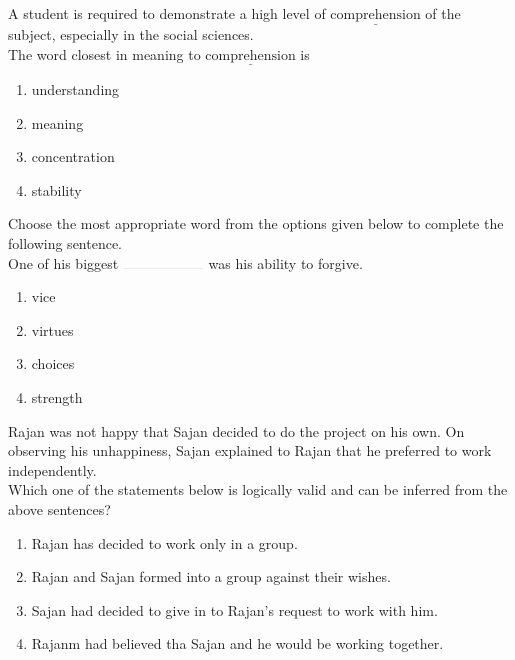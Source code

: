 \iffalse
\chapter{2013}
\author{EE24BTECH11003}
\section{ce}
\fi
\item A student is required to demonstrate a high level of $\underline{\text{comprehension}}$ of the subject, especially in the social sciences.\\
The word closest in meaning to $\underline{\text{comprehension}}$ is
\hfill{}
\begin{enumerate}
\item understanding
\item meaning
\item concentration
\item stability
\end{enumerate}

\item Choose the most appropriate word from the options given below to complete the following sentence.\\
One of his biggest $\rule{2cm}{0.1pt}$ was his ability to forgive.
\hfill{}
\begin{enumerate}
\item vice
\item virtues
\item choices
\item strength
\end{enumerate}

\item Rajan was not happy that Sajan decided to do the project on his own. On observing his unhappiness, Sajan explained to Rajan that he preferred to work independently.\\
Which one of the statements below is logically valid and can be inferred from the above sentences?
\hfill{}
\begin{enumerate}
\item Rajan has decided to work only in a group.
\item Rajan and Sajan formed into a group against their wishes.
\item Sajan had decided to give in to Rajan's request to work with him.
\item Rajanm had believed tha Sajan and he would be working together.
\end{enumerate}

